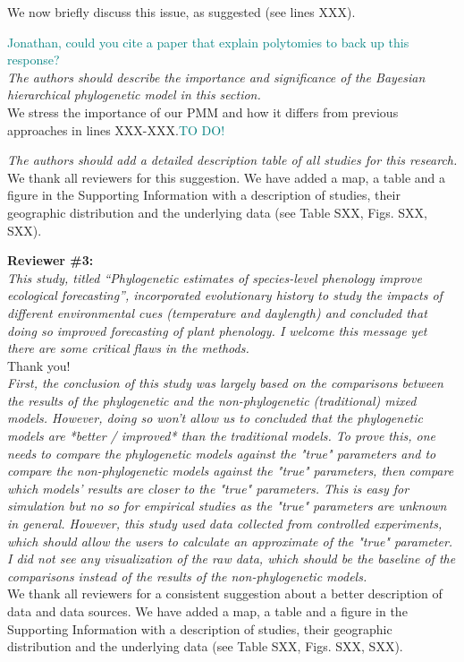 \documentclass[11pt]{article}
\begin{document}
We now briefly discuss this issue, as suggested (see lines XXX).

\textcolor{teal}{Jonathan, could you  cite a paper that explain polytomies to back up this response?}\\

\emph{The authors should describe the importance and significance of the Bayesian hierarchical phylogenetic model in this section.}\\
We stress the importance of our PMM and how it differs from previous approaches in lines XXX-XXX.\textcolor{teal}{TO DO!}


\emph{The authors should add a detailed description table of all studies for this research.}\\
We thank all reviewers for this suggestion. We have added a map, a table and a figure in the Supporting Information with a description of studies, their geographic distribution and the underlying data (see Table SXX, Figs. SXX, SXX).



{\bf Reviewer \#3:}\\

\emph{This study, titled “Phylogenetic estimates of species-level phenology improve ecological forecasting”, incorporated evolutionary history to study the impacts of different environmental cues (temperature and daylength) and concluded that doing so improved forecasting of plant phenology. I welcome this message yet there are some critical flaws in the methods.}\\

Thank you!\\

\emph{First, the conclusion of this study was largely based on the comparisons between the results of the phylogenetic and the non-phylogenetic (traditional) mixed models. However, doing so won't allow us to concluded that the phylogenetic models are *better / improved* than the traditional models. To prove this, one needs to compare the phylogenetic models against the "true" parameters and to compare the non-phylogenetic models against the "true" parameters, then compare which models' results are closer to the "true" parameters. This is easy for simulation but no so for empirical studies as the "true" parameters are unknown in general. However, this study used data collected from controlled experiments, which should allow the users to calculate an approximate of the "true" parameter. I did not see any visualization of the raw data, which should be the baseline of the comparisons instead of the results of the non-phylogenetic models.}\\
We thank all reviewers for a consistent suggestion about a better description of data and data sources. We have added a map, a table and a figure in the Supporting Information with a description of studies, their geographic distribution and the underlying data (see Table SXX, Figs. SXX, SXX).
\end{document}
